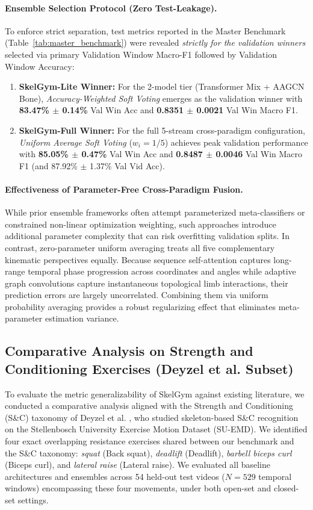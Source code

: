 \documentclass[preprint,12pt]{elsarticle}
\begin{document}
\paragraph{Ensemble Selection Protocol (Zero Test-Leakage).} To enforce strict separation, test metrics reported in the Master Benchmark (Table~\ref{tab:master_benchmark}) were revealed \textit{strictly for the validation winners} selected via primary Validation Window Macro-F1 followed by Validation Window Accuracy:
\begin{enumerate}
    \item \textbf{SkelGym-Lite Winner:} For the 2-model tier (Transformer Mix + AAGCN Bone), \textit{Accuracy-Weighted Soft Voting} emerges as the validation winner with \textbf{83.47\% $\pm$ 0.14\%} Val Win Acc and \textbf{0.8351 $\pm$ 0.0021} Val Win Macro F1.
    \item \textbf{SkelGym-Full Winner:} For the full 5-stream cross-paradigm configuration, \textit{Uniform Average Soft Voting} ($w_i = 1/5$) achieves peak validation performance with \textbf{85.05\% $\pm$ 0.47\%} Val Win Acc and \textbf{0.8487 $\pm$ 0.0046} Val Win Macro F1 (and 87.92\% $\pm$ 1.37\% Val Vid Acc).
\end{enumerate}

\paragraph{Effectiveness of Parameter-Free Cross-Paradigm Fusion.}
While prior ensemble frameworks often attempt parameterized meta-classifiers or constrained non-linear optimization weighting, such approaches introduce additional parameter complexity that can risk overfitting validation splits. In contrast, zero-parameter uniform averaging treats all five complementary kinematic perspectives equally. Because sequence self-attention captures long-range temporal phase progression across coordinates and angles while adaptive graph convolutions capture instantaneous topological limb interactions, their prediction errors are largely uncorrelated. Combining them via uniform probability averaging provides a robust regularizing effect that eliminates meta-parameter estimation variance.

\subsection{Comparative Analysis on Strength and Conditioning Exercises (Deyzel et al. Subset)}
\label{sec:external_benchmark}
To evaluate the metric generalizability of SkelGym against existing literature, we conducted a comparative analysis aligned with the Strength and Conditioning (S\&C) taxonomy of Deyzel et al. \cite{deyzel2023}, who studied skeleton-based S\&C recognition on the Stellenbosch University Exercise Motion Dataset (SU-EMD). We identified four exact overlapping resistance exercises shared between our benchmark and the S\&C taxonomy: \textit{squat} (Back squat), \textit{deadlift} (Deadlift), \textit{barbell biceps curl} (Biceps curl), and \textit{lateral raise} (Lateral raise). We evaluated all baseline architectures and ensembles across 54 held-out test videos ($N=529$ temporal windows) encompassing these four movements, under both open-set and closed-set settings.
\end{document}
